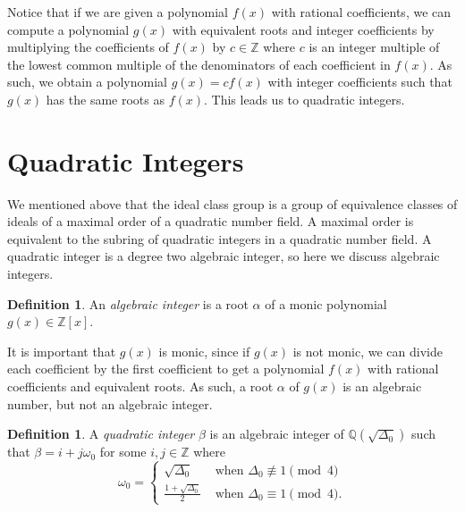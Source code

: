 \documentclass{ucalgthes1}
\theoremstyle{plain}
\theoremstyle{definition}
\newtheorem{defn}[thm]{Definition}
\newcommand{\ZZ}{\mathbb{Z}}
\newcommand{\QQ}{\mathbb{Q}}
\begin{document}
Notice that if we are given a polynomial $f(x)$ with rational coefficients, we can compute a polynomial $g(x)$ with equivalent roots and integer coefficients by multiplying the coefficients of $f(x)$ by $c \in \ZZ$ where $c$ is an integer multiple of the lowest common multiple of the denominators of each coefficient in $f(x)$.  As such, we obtain a polynomial $g(x) = cf(x)$ with integer coefficients such that $g(x)$ has the same roots as $f(x)$.  This leads us to quadratic integers.


\bigbreak
\section{Quadratic Integers}

We mentioned above that the ideal class group is a group of equivalence classes of ideals of a maximal order of a quadratic number field.  A maximal order is equivalent to the subring of quadratic integers in a quadratic number field.  A quadratic integer is a degree two algebraic integer, so here we discuss algebraic integers.

\begin{defn}
An \emph{algebraic integer} is a root $\alpha$ of a monic polynomial $g(x) \in \ZZ[x]$.
\end{defn}

\noindent
It is important that $g(x)$ is monic, since if $g(x)$ is not monic, we can divide each coefficient by the first coefficient to get a polynomial $f(x)$ with rational coefficients and equivalent roots.  As such, a root $\alpha$ of $g(x)$ is an algebraic number, but not an algebraic integer.


\begin{defn}
\label{defn:quadraticInteger}
A \emph{quadratic integer} $\beta$ is an algebraic integer of $\QQ(\sqrt{\Delta_0})$ such that $\beta = i + j \omega_0$ for some $i,j \in \ZZ$ where
\[
	\omega_0 = \begin{cases}
		\sqrt{\Delta_0} & \textrm{ when } \Delta_0 \not \equiv 1 \pmod 4 \\
		\frac{1+\sqrt{\Delta_0}}{2} & \textrm{ when } \Delta_0 \equiv 1 \pmod 4.
	\end{cases}
\]
\end{defn}
\end{document}
